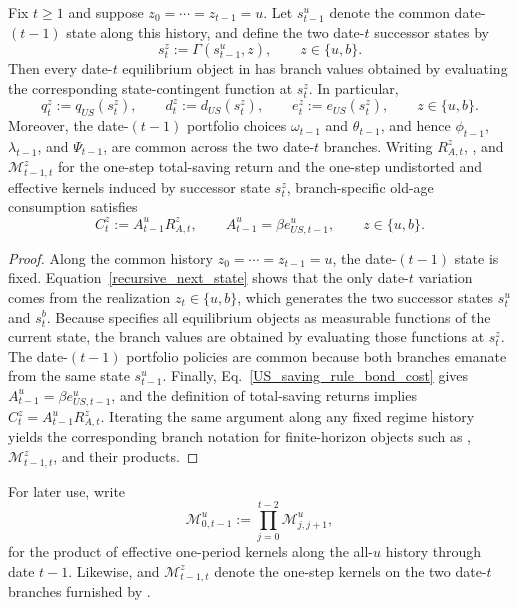 \documentclass{article}
\begin{document}
\begin{lem}\label{lem_branch_reduction}\label{ass_switch_dependence}
Fix $t\ge 1$ and suppose $z_0=\cdots=z_{t-1}=u$. Let $s_{t-1}^u$ denote the common date-$(t-1)$ state along this history, and define the two date-$t$ successor states by
\[
s_t^z:=\Gamma(s_{t-1}^u,z),
\qquad
z\in\{u,b\}.
\]
Then every date-$t$ equilibrium object in  has branch values obtained by evaluating the corresponding state-contingent function at $s_t^z$. In particular,
\[
q_t^z:=q_{US}(s_t^z),
\qquad
d_t^z:=d_{US}(s_t^z),
\qquad
e_t^z:=e_{US}(s_t^z),
\qquad
z\in\{u,b\}.
\]
Moreover, the date-$(t-1)$ portfolio choices $\omega_{t-1}$ and $\theta_{t-1}$, and hence $\phi_{t-1}$, $\lambda_{t-1}$, and $\Psi_{t-1}$, are common across the two date-$t$ branches. Writing $R_{A,t}^z$, , and $\mathcal M_{t-1,t}^z$ for the one-step total-saving return and the one-step undistorted and effective kernels induced by successor state $s_t^z$, branch-specific old-age consumption satisfies
\[
C_t^z:=A_{t-1}^uR_{A,t}^z,
\qquad
A_{t-1}^u=\beta e_{US,t-1}^u,
\qquad
z\in\{u,b\}.
\]
\end{lem}

\begin{proof}
Along the common history $z_0=\cdots=z_{t-1}=u$, the date-$(t-1)$ state is fixed. Equation~\eqref{recursive_next_state} shows that the only date-$t$ variation comes from the realization $z_t\in\{u,b\}$, which generates the two successor states $s_t^u$ and $s_t^b$. Because  specifies all equilibrium objects as measurable functions of the current state, the branch values are obtained by evaluating those functions at $s_t^z$. The date-$(t-1)$ portfolio policies are common because both branches emanate from the same state $s_{t-1}^u$. Finally, Eq.~\eqref{US_saving_rule_bond_cost} gives $A_{t-1}^u=\beta e_{US,t-1}^u$, and the definition of total-saving returns implies $C_t^z=A_{t-1}^uR_{A,t}^z$. Iterating the same argument along any fixed regime history yields the corresponding branch notation for finite-horizon objects such as , $\mathcal M_{t-1,t}^z$, and their products.
\end{proof}

For later use, write
\[
\mathcal M_{0,t-1}^u:=\prod_{j=0}^{t-2}\mathcal M_{j,j+1}^u,
\]
for the product of effective one-period kernels along the all-$u$ history through date $t-1$. Likewise,  and $\mathcal M_{t-1,t}^z$ denote the one-step kernels on the two date-$t$ branches furnished by .
\end{document}
